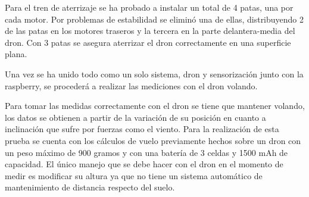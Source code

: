 Para el tren de aterrizaje se ha probado a instalar un total de 4 patas, una por cada motor. Por problemas de estabilidad se eliminó una de ellas, distribuyendo 2 de las patas en los motores traseros y la tercera en la parte delantera-media del dron. Con 3 patas se asegura aterrizar el dron correctamente en una superficie plana.


Una vez se ha unido todo como un solo sistema, dron y sensorización junto con la raspberry, se procederá a realizar las mediciones con el dron volando.

Para tomar las medidas correctamente con el dron se tiene que mantener volando, los datos se obtienen a partir de la variación de su posición en cuanto a inclinación que sufre por fuerzas como el viento.
Para la realización de esta prueba se cuenta con los cálculos de vuelo previamente hechos sobre un dron con un peso máximo de 900 gramos y con una batería de 3 celdas y 1500 mAh de capacidad. El único manejo que se debe hacer con el dron en el momento de medir es modificar su altura ya que no tiene un sistema automático de mantenimiento de distancia respecto del suelo.




